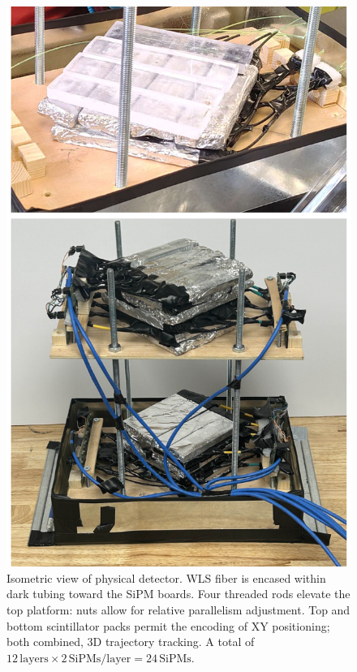 \begin{figure}[h]
    \centering
    \includegraphics[scale=0.65]{figures/bare rods.png}
    \caption{Isometric view of physical detector. WLS fiber is encased within dark tubing toward the SiPM boards. Four threaded rods elevate the top platform: nuts allow for relative parallelism adjustment. Top and bottom scintillator packs permit the encoding of XY positioning; both combined, 3D trajectory tracking. A total of $12\,\text{layers} \times 2\,\text{SiPMs/layer} = 24\,\text{SiPMs}$.}
    \label{fig1}
\end{figure}



